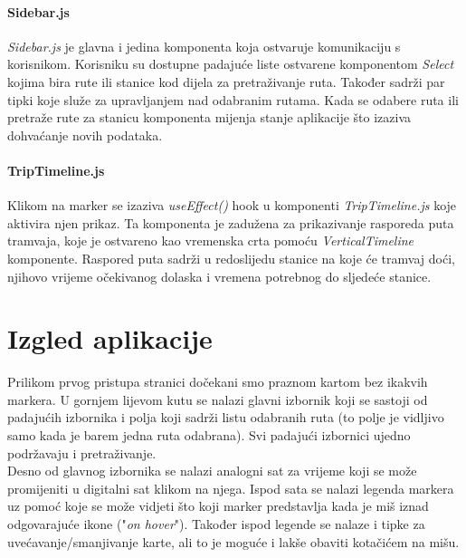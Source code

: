 \documentclass[zavrsnirad]{fer}
\begin{document}
\subsubsection{Sidebar.js}
\textit{Sidebar.js} je glavna i jedina komponenta koja ostvaruje komunikaciju s korisnikom. Korisniku su dostupne padajuće liste ostvarene komponentom \textit{Select} kojima bira rute ili stanice kod dijela za pretraživanje ruta. Također sadrži par tipki koje služe za upravljanjem nad odabranim rutama. Kada se odabere ruta ili pretraže rute za stanicu komponenta mijenja stanje aplikacije što izaziva dohvaćanje novih podataka.

\subsubsection{TripTimeline.js}
Klikom na marker se izaziva \textit{useEffect()} hook u komponenti \textit{TripTimeline.js} koje aktivira njen prikaz. Ta komponenta je zadužena za prikazivanje rasporeda puta tramvaja, koje je ostvareno kao vremenska crta pomoću \textit{VerticalTimeline} komponente. Raspored puta sadrži u redoslijedu stanice na koje će tramvaj doći, njihovo vrijeme očekivanog dolaska i vremena potrebnog do sljedeće stanice.

\newpage
\chapter{Izgled aplikacije}
Prilikom prvog pristupa stranici dočekani smo praznom kartom bez ikakvih markera. U gornjem lijevom kutu se nalazi glavni izbornik koji se sastoji od padajućih izbornika i polja koji sadrži listu odabranih ruta (to polje je vidljivo samo kada je barem jedna ruta odabrana). Svi padajući izbornici ujedno podržavaju i pretraživanje.\\
Desno od glavnog izbornika se nalazi analogni sat za vrijeme koji se može promijeniti u digitalni sat klikom na njega. Ispod sata se nalazi legenda markera uz pomoć koje se može vidjeti što koji marker predstavlja kada je miš iznad odgovarajuće ikone ("\textit{on hover}"). Također ispod legende se nalaze i tipke za uvećavanje/smanjivanje karte, ali to je moguće i lakše obaviti kotačićem na mišu.
\end{document}
